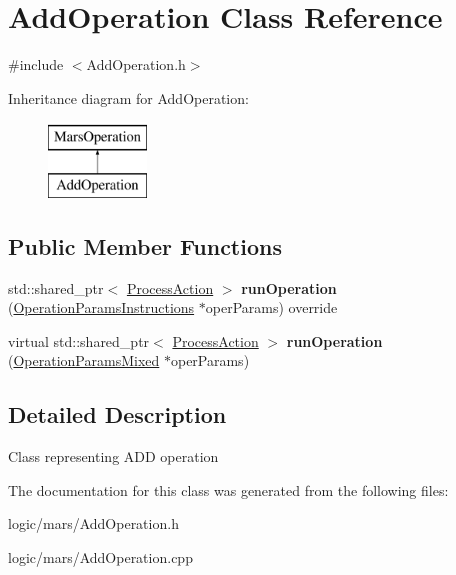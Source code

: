 \hypertarget{classAddOperation}{}\section{Add\+Operation Class Reference}
\label{classAddOperation}


{\ttfamily \#include $<$Add\+Operation.\+h$>$}

Inheritance diagram for Add\+Operation\+:\begin{figure}[H]
\begin{center}
\leavevmode
\includegraphics[height=2.000000cm]{classAddOperation}
\end{center}
\end{figure}
\subsection*{Public Member Functions}
\begin{DoxyCompactItemize}
\item 
\mbox{\label{classAddOperation_a09f26b6d19ad82d86965f929f1a133ee}} 
std\+::shared\+\_\+ptr$<$ \hyperlink{classProcessAction}{Process\+Action} $>$ {\bfseries run\+Operation} (\hyperlink{classOperationParamsInstructions}{Operation\+Params\+Instructions} $\ast$oper\+Params) override
\item 
\mbox{\label{classAddOperation_a5a1373c509e314045ca2483019bd0739}} 
virtual std\+::shared\+\_\+ptr$<$ \hyperlink{classProcessAction}{Process\+Action} $>$ {\bfseries run\+Operation} (\hyperlink{classOperationParamsMixed}{Operation\+Params\+Mixed} $\ast$oper\+Params)
\end{DoxyCompactItemize}


\subsection{Detailed Description}
Class representing A\+DD operation 

The documentation for this class was generated from the following files\+:\begin{DoxyCompactItemize}
\item 
logic/mars/Add\+Operation.\+h\item 
logic/mars/Add\+Operation.\+cpp\end{DoxyCompactItemize}
